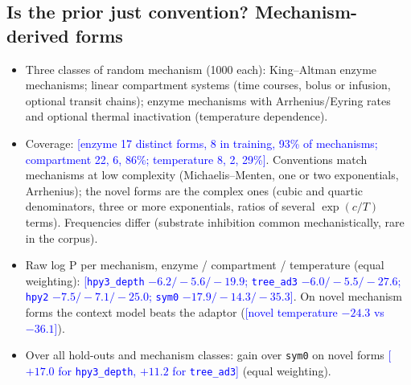 \documentclass[11pt]{article}
\newcommand{\cur}[1]{\textcolor{blue}{[#1]}}
\begin{document}
\subsection{Is the prior just convention? Mechanism-derived forms}
\begin{itemize}
  \item Three classes of random mechanism (1000 each): King--Altman enzyme mechanisms; linear
  compartment systems (time courses, bolus or infusion, optional transit chains); enzyme mechanisms
  with Arrhenius/Eyring rates and optional thermal inactivation (temperature dependence).
  \item Coverage: \cur{enzyme 17 distinct forms, 8 in training, 93\% of mechanisms; compartment 22,
  6, 86\%; temperature 8, 2, 29\%}. Conventions match mechanisms at low complexity (Michaelis--Menten,
  one or two exponentials, Arrhenius); the novel forms are the complex ones (cubic and quartic
  denominators, three or more exponentials, ratios of several $\exp(c/T)$ terms). Frequencies
  differ (substrate inhibition common mechanistically, rare in the corpus).
  \item Raw log P per mechanism, enzyme / compartment / temperature (equal weighting):
  \cur{\texttt{hpy3\_depth} $-6.2/-5.6/-19.9$; \texttt{tree\_ad3} $-6.0/-5.5/-27.6$; \texttt{hpy2}
  $-7.5/-7.1/-25.0$; \texttt{sym0} $-17.9/-14.3/-35.3$}. On novel mechanism forms the context
  model beats the adaptor (\cur{novel temperature $-24.3$ vs $-36.1$}).
  \item Over all hold-outs and mechanism classes: gain over \texttt{sym0} on novel forms
  \cur{$+17.0$ for \texttt{hpy3\_depth}, $+11.2$ for \texttt{tree\_ad3}} (equal weighting).
\end{itemize}
\end{document}
